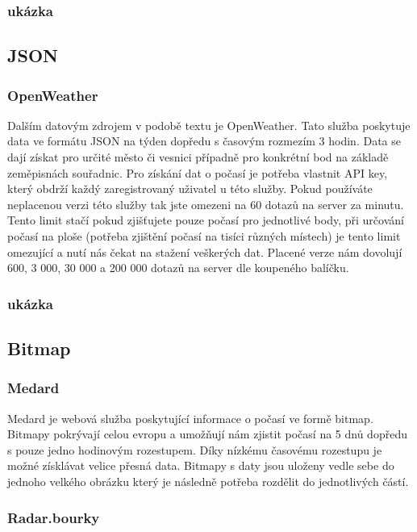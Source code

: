 \documentclass[czech,bachelor,dept460,male,csharp,cpdeclaration]{diploma}
\begin{document}
	\subsubsection{ukázka}
	\subsection{JSON}
	\subsubsection{OpenWeather}
	
	Dalším datovým zdrojem v podobě textu je OpenWeather. Tato služba poskytuje data ve formátu JSON na týden dopředu s časovým rozmezím 3 hodin. Data se dají získat pro určité město či vesnici případně pro konkrétní bod na základě zeměpisnách souřadnic. Pro získání dat o počasí je potřeba vlastnit API key, který obdrží každý zaregistrovaný uživatel u této služby. Pokud používáte neplacenou verzi této služby tak jste omezeni na 60 dotazů na server za minutu. Tento limit stačí pokud zjišťujete pouze počasí pro jednotlivé body, při určování počasí na ploše (potřeba zjištění počasí na tisíci různých místech) je tento limit omezující a nutí nás čekat na stažení veškerých dat. Placené verze nám dovolují 600, 3 000, 30 000 a 200 000 dotazů na server dle koupeného balíčku.
	
	\subsubsection{ukázka}
	\subsection{Bitmap}
	\subsubsection{Medard}
	
	Medard je webová služba poskytující informace o počasí ve formě bitmap. Bitmapy pokrývají celou evropu a umožňují nám zjistit počasí na 5 dnů dopředu s pouze jedno hodinovým rozestupem. Díky nízkému časovému rozestupu je možné získlávat velice přesná data. Bitmapy s daty jsou uloženy vedle sebe do jednoho velkého obrázku který je následně potřeba rozdělit do jednotlivých částí.
	
	\subsubsection{Radar.bourky}
	
\end{document}
